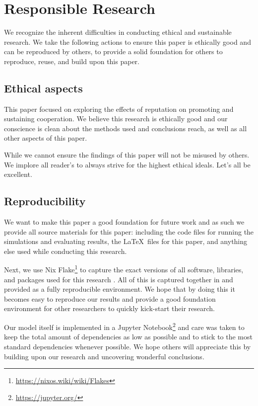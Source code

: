 \documentclass[english]{article}
\begin{document}



\section{Responsible Research}
We recognize the inherent difficulties in conducting ethical and sustainable research.
We take the following actions to ensure this paper is ethically good
and can be reproduced by others, to provide a solid foundation for others to reproduce, reuse, and build upon this paper.

\subsection{Ethical aspects}
This paper focused on exploring the effects of reputation on promoting and sustaining cooperation.
We believe this research is ethically good and our conscience is clean about the methods used and conclusions reach, as well as all other aspects of this paper.

While we cannot ensure the findings of this paper will not be misused by others. We implore all reader's to always strive for the highest ethical ideals.
Let's all be excellent.

\subsection{Reproducibility}
We want to make this paper a good foundation for future work and as such we provide all source materials for this paper: including the code files for running the simulations and evaluating results, the \LaTeX\ files for this paper, and anything else used while conducting this research.

Next, we use Nix Flake\footnote{\url{https://nixos.wiki/wiki/Flakes}} to capture the exact versions of all software, libraries, and packages used for this research \citep{nix}. All of this is captured together in and provided as a fully reproducible environment.
We hope that by doing this it becomes easy to reproduce our results and provide a good foundation environment for other researchers to quickly kick-start their research.

Our model itself is implemented in a Jupyter Notebook\footnote{\url{https://jupyter.org/}} and care was taken to keep the total amount of dependencies as low as possible and to stick to the most standard dependencies whenever possible.
We hope others will appreciate this by building upon our research and uncovering wonderful conclusions.
\end{document}
